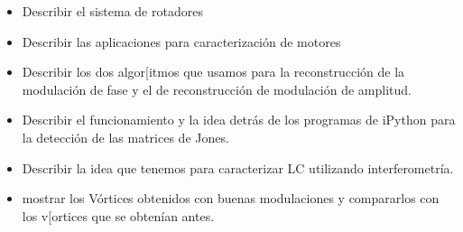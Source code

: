 \begin{itemize}
\item Describir el sistema de rotadores
\item Describir las aplicaciones para caracterización de motores
\item Describir los dos algor[itmos que usamos para la reconstrucción
  de la modulación de fase y el de reconstrucción de modulación de
  amplitud. 
\item Describir el funcionamiento y la idea detrás de los programas de
  iPython para la detección de las matrices de Jones.
\item Describir la idea que tenemos para caracterizar LC utilizando
  interferometría.
\item mostrar los Vórtices obtenidos con buenas modulaciones y
  compararlos con los v[ortices que se obtenían antes.
\end{itemize}


\newpage
\pagebreak[4]
